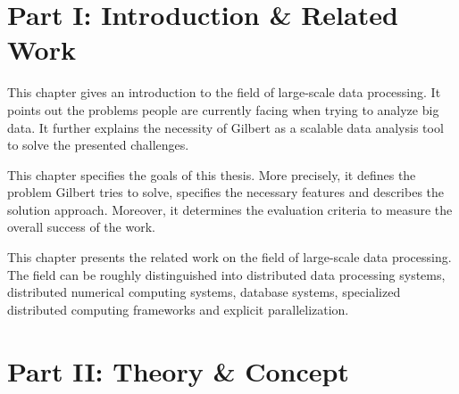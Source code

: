 \clearemptydoublepage

{}

\begin{center}
\end{center}

\section*{Part I: Introduction \& Related Work}

\vspace{3mm}


\noindent This chapter gives an introduction to the field of large-scale data processing. 
It points out the problems people are currently facing when trying to analyze big data. 
It further explains the necessity of Gilbert as a scalable data analysis tool to solve the presented challenges.

\vspace{3mm}


\noindent This chapter specifies the goals of this thesis. 
More precisely, it defines the problem Gilbert tries to solve, specifies the necessary features and describes the solution approach. 
Moreover, it determines the evaluation criteria to measure the overall success of the work.

\vspace{3mm}


\noindent This chapter presents the related work on the field of large-scale data processing. 
The field can be roughly distinguished into distributed data processing systems, distributed numerical computing systems, database systems, specialized distributed computing frameworks and explicit parallelization.

\vspace{3mm}

\section*{Part II: Theory \& Concept}

\vspace{3mm}

